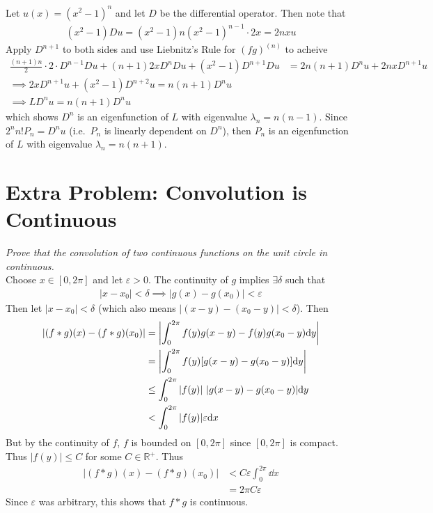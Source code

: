 \documentclass[12pt]{article}
\newcommand{\E}{\varepsilon}
\theoremstyle{plain}
\begin{document}
\begin{enumerate}[(a)]
        Let $u(x) = (x^2 - 1)^n$ and let $D$ be the differential operator.  Then note that
        \begin{align*}
            (x^2 - 1)Du = (x^2 - 1)n(x^2 - 1)^{n-1} \cdot 2x = 2nxu
        \end{align*}
        Apply $D^{n+1}$ to both sides and use Liebnitz's Rule for $(fg)^{(n)}$ to acheive
        \begin{align*}
            \frac{(n+1)n}{2}\cdot 2\cdot D^{n-1}Du + (n+1)2x D^n Du + (x^2 - 1)D^{n+1}Du &= 2n(n+1)D^nu + 2nxD^{n+1}u \\
            \implies 2xD^{n+1}u + (x^2 - 1)D^{n+2}u = n(n+1)D^n u\\
            \implies LD^nu = n(n+1)D^n u
        \end{align*}
        which shows $D^n$ is an eigenfunction of $L$ with eigenvalue $\lambda_n = n(n-1)$.  Since $2^n n! P_n = D^nu$ (i.e.~$P_n$ is linearly dependent on $D^n$), then $P_n$ is an eigenfunction of $L$ with eigenvalue $\lambda_n = n(n+1)$.
\end{enumerate}

\section*{Extra Problem: Convolution is Continuous}
\emph{Prove that the convolution of two continuous functions on the unit circle in continuous.} \\

Choose $x \in [0, 2 \pi]$ and let $\E > 0$.  The continuity of $g$ implies $\exists \delta$ such that
\begin{align*}
    |x - x_0| < \delta \implies |g(x) - g(x_0)| < \E
\end{align*}
Then let $|x - x_0| < \delta$ (which also means $|(x-y) - (x_0-y)| < \delta$).  Then
\begin{align*}
    |(f*g)(x) - (f*g)(x_0)| &= \left|\int_0^{2\pi}f(y)g(x-y) - f(y)g(x_0 - y) \dd y\right| \\
    &= \left|\int_0^{2\pi} f(y)\qty[g(x-y) - g(x_0 - y)]\dd y\right| \\
    &\leq \int_0^{2\pi} |f(y)|\ |g(x-y) - g(x_0 - y)| \dd y \\
    &< \int_0^{2\pi}|f(y)| \E \dd x
\end{align*}
But by the continuity of $f$, $f$ is bounded on $[0, 2\pi]$ since $[0, 2\pi]$ is compact.  Thus $|f(y)| \leq C$ for some $C \in \mathbb{R}^+$.  Thus
\begin{align*}
    |(f*g)(x) - (f*g)(x_0)| &< C\E\int_0^{2\pi}\dd x \\
    &= 2\pi C\E
\end{align*}
Since $\E$ was arbitrary, this shows that $f*g$ is continuous.
\end{document}
